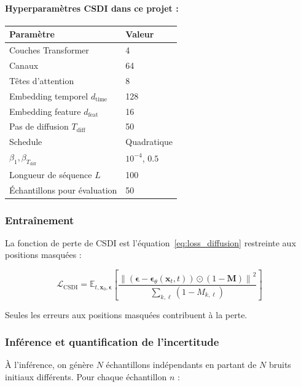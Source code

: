 \documentclass[12pt,a4paper]{article}
\newcommand{\E}{\mathbb{E}}
\newcommand{\bx}{\bm{x}}
\newcommand{\beps}{\bm{\epsilon}}
\begin{document}
\paragraph{Hyperparamètres CSDI dans ce projet :}
\begin{center}
\begin{tabular}{ll}
\toprule
\textbf{Param\`etre} & \textbf{Valeur} \\
\midrule
Couches Transformer & 4 \\
Canaux & 64 \\
T\^etes d'attention & 8 \\
Embedding temporel $d_{\text{time}}$ & 128 \\
Embedding feature $d_{\text{feat}}$ & 16 \\
Pas de diffusion $T_{\text{diff}}$ & 50 \\
Schedule & Quadratique \\
$\beta_1, \beta_{T_{\text{diff}}}$ & $10^{-4}$, $0.5$ \\
Longueur de s\'equence $L$ & 100 \\
\'Echantillons pour \'evaluation & 50 \\
\bottomrule
\end{tabular}
\end{center}

\subsubsection{Entra\^inement}

La fonction de perte de CSDI est l'\'equation~\eqref{eq:loss_diffusion} restreinte aux positions masqu\'ees :

\begin{equation}
\boxed{\mathcal{L}_{\text{CSDI}} = \E_{t, \bx_0, \beps}\left[\frac{\left\|(\beps - \beps_\theta(\bx_t, t)) \odot (1-\bm{M})\right\|^2}{\sum_{k,\ell}(1-M_{k,\ell})}\right]}
\label{eq:loss_csdi}
\end{equation}

Seules les erreurs aux positions masqu\'ees contribuent \`a la perte.

\subsubsection{Inf\'erence et quantification de l'incertitude}

\`A l'inf\'erence, on g\'en\`ere $N$ \'echantillons ind\'ependants en partant de $N$ bruits initiaux diff\'erents. Pour chaque \'echantillon $n$ :
\end{document}
